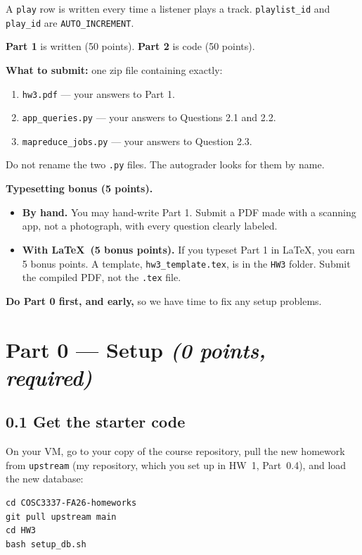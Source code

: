 \documentclass[11pt]{article}
\newcommand{\code}[1]{\texttt{#1}}
\begin{document}
A \code{play} row is written every time a listener plays a track.
\code{playlist\_id} and \code{play\_id} are \code{AUTO\_INCREMENT}.

\textbf{Part 1} is written (50 points). \textbf{Part 2} is code (50 points).

\textbf{What to submit:} one zip file containing exactly:
\begin{enumerate}[nosep]
  \item \code{hw3.pdf} --- your answers to Part 1.
  \item \code{app\_queries.py} --- your answers to Questions 2.1 and 2.2.
  \item \code{mapreduce\_jobs.py} --- your answers to Question 2.3.
\end{enumerate}
Do not rename the two \code{.py} files. The autograder looks for them by name.

\textbf{Typesetting bonus (5 points).}
\begin{itemize}
  \item \textbf{By hand.} You may hand-write Part 1. Submit a PDF made with a
  scanning app, not a photograph, with every question clearly labeled.
  \item \textbf{With \LaTeX\ (5 bonus points).} If you typeset Part 1 in \LaTeX,
  you earn 5 bonus points. A template, \code{hw3\_template.tex}, is in the
  \code{HW3} folder. Submit the compiled PDF, not the \code{.tex} file.
\end{itemize}

\textbf{Do Part 0 first, and early,} so we have time to fix any setup problems.

\section*{Part 0 --- Setup \hfill \textit{(0 points, required)}}

\subsection*{0.1 Get the starter code}

On your VM, go to your copy of the course repository, pull the new homework
from \code{upstream} (my repository, which you set up in HW~1, Part~0.4), and
load the new database:
\begin{lstlisting}
cd COSC3337-FA26-homeworks
git pull upstream main
cd HW3
bash setup_db.sh
\end{lstlisting}
\end{document}
